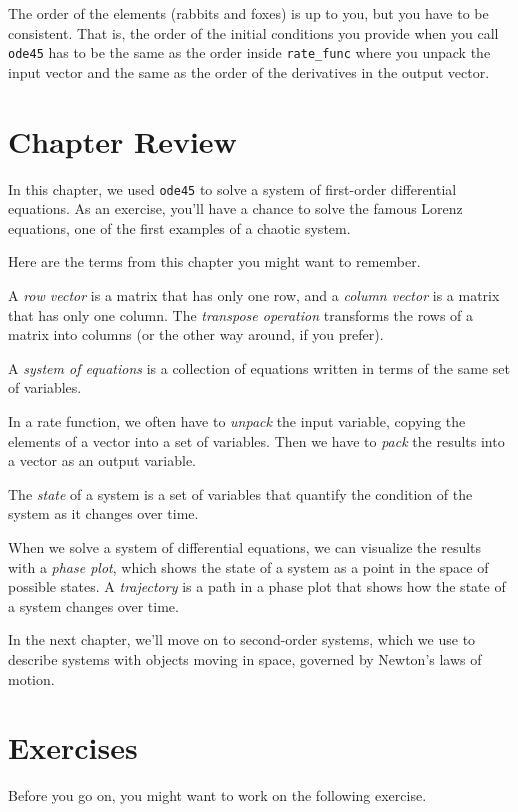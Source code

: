 The order of the elements (rabbits and foxes) is up to you, but
you have to be consistent.  That is, the order of the initial conditions you
provide when you call \lstinline{ode45} has to be the same as the order
inside \lstinline{rate_func} where you unpack the input vector and the
same as the order of the derivatives in the output vector.

\section{Chapter Review}

In this chapter, we used \lstinline{ode45} to solve a system of first-order differential equations.
As an exercise, you'll have a chance to solve the famous Lorenz equations, one of the first examples of a chaotic system.

Here are the terms from this chapter you might want to remember.

A \emph{row vector} is a matrix that has only one row, and a \emph{column vector} is a matrix that has only one column.
The \emph{transpose operation} transforms the  rows of a matrix
into columns (or the other way around, if you prefer).

A \emph{system of equations} is a collection of equations written in terms of
the same set of variables.

In a rate function, we often have to \emph{unpack} the input variable,
copying the elements of a vector into a set of variables.
Then we have to \emph{pack} the results into a vector as an output variable.

The \emph{state} of a system is a set of variables that quantify the condition of the system as it changes over time.

When we solve a system of differential equations, we can visualize the results with a \emph{phase plot}, which shows the state of a system as a point in the space of possible states.
A \emph{trajectory} is a path in a phase plot that shows how the state of a system changes over time.

In the next chapter, we'll move on to second-order systems, which we use to describe systems
with objects moving in space, governed by Newton's laws of motion.


\section{Exercises}

Before you go on, you might want to work on the following exercise.

